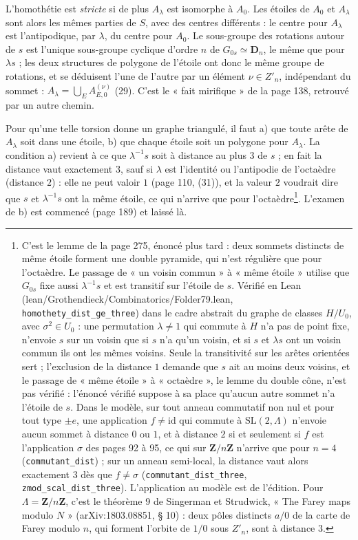 \documentclass[11pt,a4paper]{article}
\begin{document}
L'homothétie est \emph{stricte} si de plus $A_\lambda$ est isomorphe à $A_0$.
Les étoiles de $A_0$ et $A_\lambda$ sont alors les mêmes parties de $S$, avec
des centres différents : le centre pour $A_\lambda$ est l'antipodique, par
$\lambda$, du centre pour $A_0$. Le sous-groupe des rotations autour de $s$ est
l'unique sous-groupe cyclique d'ordre $n$ de $G_{0s} \simeq \mathbf{D}_n$, le
même que pour $\lambda s$ ; les deux structures de polygone de l'étoile ont donc
le même groupe de rotations, et se déduisent l'une de l'autre par un élément
$\nu \in Z'_n$, indépendant du sommet : $A_\lambda = \bigcup_E A_{E,0}^{(\nu)}$
(29). C'est le « fait mirifique » de la page 138, retrouvé par un autre chemin.

Pour qu'une telle torsion donne un graphe triangulé, il faut a) que toute arête
de $A_\lambda$ soit dans une étoile, b) que chaque étoile soit un polygone pour
$A_\lambda$. La condition a) revient à ce que $\lambda^{-1}s$ soit à distance au
plus $3$ de $s$ ; en fait la distance vaut exactement $3$, sauf si $\lambda$ est
l'identité ou l'antipodie de l'octaèdre (distance $2$) : elle ne peut valoir $1$
(page 110, (31)), et la valeur $2$ voudrait dire que $s$ et $\lambda^{-1}s$ ont
la même étoile, ce qui n'arrive que pour l'octaèdre\footnote{C'est le lemme de
la page 275, énoncé plus tard : deux sommets distincts de même étoile forment
une double pyramide, qui n'est régulière que pour l'octaèdre. Le passage de
« un voisin commun » à « même étoile » utilise que $G_{0s}$ fixe aussi
$\lambda^{-1}s$ et est transitif sur l'étoile de $s$. Vérifié en Lean
(lean/Grothendieck/Combinatorics/Folder79.lean, \texttt{homothety\_dist\_ge\_three}) dans
le cadre abstrait du graphe de classes $H/U_0$, avec $\sigma^2 \in U_0$ : une
permutation $\lambda \neq 1$ qui commute à $H$ n'a pas de point fixe, n'envoie
$s$ sur un voisin que si $s$ n'a qu'un voisin, et si $s$ et $\lambda s$ ont un
voisin commun ils ont les mêmes voisins. Seule la transitivité sur les arêtes
orientées sert ; l'exclusion de la distance $1$ demande que $s$ ait au moins
deux voisins, et le passage de « même étoile » à « octaèdre », le lemme du
double cône, n'est pas vérifié : l'énoncé vérifié suppose à sa place qu'aucun
autre sommet n'a l'étoile de $s$. Dans le modèle, sur tout anneau commutatif
non nul et pour tout type $\pm e$, une application $f \neq \mathrm{id}$ qui
commute à $\mathrm{SL}(2, \Lambda)$ n'envoie aucun sommet à distance $0$ ou
$1$, et à distance $2$ si et seulement si $f$ est l'application $\sigma$ des
pages 92 à 95, ce qui sur $\mathbf{Z}/n\mathbf{Z}$ n'arrive que pour $n = 4$
(\texttt{commutant\_dist}) ; sur un anneau semi-local, la distance vaut alors
exactement $3$ dès que $f \neq \sigma$ (\texttt{commutant\_dist\_three},
\texttt{zmod\_scal\_dist\_three}). L'application au modèle est de l'édition.
Pour $\Lambda = \mathbf{Z}/n\mathbf{Z}$, c'est le théorème 9 de Singerman et
Strudwick, « The Farey maps modulo $N$ » (arXiv:1803.08851, § 10) : deux
pôles distincts $a/0$ de la carte de Farey modulo $n$, qui forment l'orbite de
$1/0$ sous $Z'_n$, sont à distance $3$.}. L'examen de b) est
commencé (page 189) et laissé là.
\end{document}

